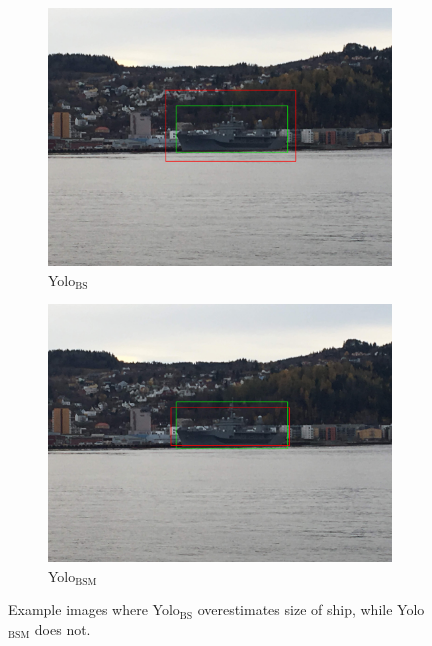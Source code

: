 \begin{figure}[h!]
\begin{subfigure}{.5\textwidth}
  \centering
  \includegraphics[width=0.75\linewidth]{results/case_tr_moor/yolo12/yolo1/big/IMG_2670.jpg}
  \caption{Yolo$_{\text{BS}}$}
\end{subfigure}%
\begin{subfigure}{.5\textwidth}
  \centering
  \includegraphics[width=.75\linewidth]{results/case_tr_moor/yolo12/yolo2/big/IMG_2670.jpg}
  \caption{Yolo$_{\text{BSM}}$}
\end{subfigure}
\caption{Example images where Yolo$_{\text{BS}}$ overestimates size of ship, while Yolo$_{\text{BSM}}$ does not.}
\label{img:yolo1_big_box}
\end{figure}

\newpage
